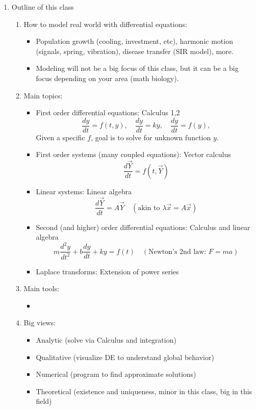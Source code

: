 \documentclass{article}
\begin{document}
\begin{enumerate}
\item Outline of this class
\begin{enumerate}
\item How to model real world with differential equations:
\begin{itemize}
\item Population growth (cooling, investment, etc), harmonic motion (signals, spring, vibration), disease transfer (SIR model), more.
\item Modeling will not be a big focus of this class, but it can be a big focus depending on your area (math biology). 
\end{itemize}
\item Main topics:
\begin{itemize}
\item First order differential equations: Calculus 1,2
\[
\frac{dy}{dt} = f(t,y), \quad \frac{dy}{dt} = ky,  
 \quad \frac{dy}{dt} = f(y),  
\]
Given a specific $f$, goal is to solve for unknown function $y$.
\item First order systems (many coupled equations): Vector calculus
\[
\frac{d\vec{Y}}{dt} = f(t,\vec{Y})
\]
\item Linear systems: Linear algebra
\[
\frac{d\vec{Y}}{dt} = A \vec{Y} \quad (\text{akin to } \lambda \vec{x}=A\vec{x})
\]
\item Second (and higher) order differential equations:  Calculus and linear algebra
\[
m \frac{d^2y}{dt^2} +b\frac{dy}{dt}+ky=f(t) \quad (\text{Newton's 2nd law: } F=ma)
\]
\item Laplace transforms: Extension of power series
\end{itemize}
\item Main tools:
\begin{itemize}
\item 
\end{itemize}
\item Big views:
\begin{itemize}
\item Analytic (solve via Calculus and integration)
\item Qualitative (visualize DE to understand global behavior)
\item Numerical (program to find approximate solutions)
\item Theoretical (existence and uniqueness, minor in this class, big in this field)
\end{itemize}
\end{enumerate}


\end{enumerate}
\end{document}
